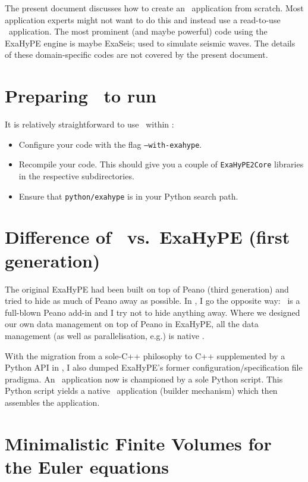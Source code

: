 The present document discusses how to create an \ExaHyPE\ application from
scratch.
Most application experts might not want to do this and instead use a read-to-use
\ExaHyPE\ application.
The most prominent (and maybe powerful) code using the ExaHyPE engine is maybe
ExaSeis; used to simulate seismic waves.
The details of these domain-specific codes are not covered by the present
document.



\section*{Preparing \Peano\ to run \ExaHyPE}

It is relatively straightforward to use \ExaHyPE\ within \Peano:

\begin{itemize}
  \item Configure your code with the flag \texttt{--with-exahype}.
  \item Recompile your code. This should give you a couple of
  \texttt{ExaHyPE2Core} libraries in the respective subdirectories.
  \item Ensure that \texttt{python/exahype} is in your Python search path.
\end{itemize}


\section*{Difference of \ExaHyPE\ vs.~ExaHyPE (first generation)}

The original ExaHyPE had been built on top of Peano (third generation) and tried
to hide as much of Peano away as possible.
In \ExaHyPE, I go the opposite way: \ExaHyPE\ is a full-blown Peano add-in and I
try not to hide anything away.
Where we designed our own data management on top of Peano in ExaHyPE, all the
data management (as well as parallelisation, e.g.) is native \Peano.


With the migration from a sole-C++ philosophy to C++ supplemented by a Python
API in \Peano, I also dumped ExaHyPE's former configuration/specification file
pradigma.
An \ExaHyPE\ application now is championed by a sole Python script.
This Python script yields a native \Peano\ application (builder mechanism) which
then assembles the application.



\section{Minimalistic Finite Volumes for the Euler equations}


